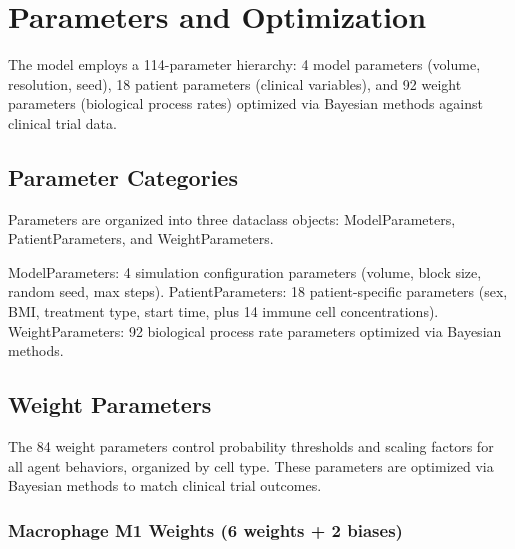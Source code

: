 \chapter{Parameters and Optimization}
\label{ch:parameters}



The model employs a 114-parameter hierarchy: 4 model parameters (volume, resolution, seed), 18 patient parameters (clinical variables), and 92 weight parameters (biological process rates) optimized via Bayesian methods against clinical trial data.

\section{Parameter Categories}
\label{sec:param-categories}

Parameters are organized into three dataclass objects: ModelParameters, PatientParameters, and WeightParameters.

ModelParameters: 4 simulation configuration parameters (volume, block size, random seed, max steps). PatientParameters: 18 patient-specific parameters (sex, BMI, treatment type, start time, plus 14 immune cell concentrations). WeightParameters: 92 biological process rate parameters optimized via Bayesian methods.

\section{Weight Parameters}
\label{sec:weight-params}

The 84 weight parameters control probability thresholds and scaling factors for all agent behaviors, organized by cell type. These parameters are optimized via Bayesian methods to match clinical trial outcomes.



\subsection{Macrophage M1 Weights (6 weights + 2 biases)}

